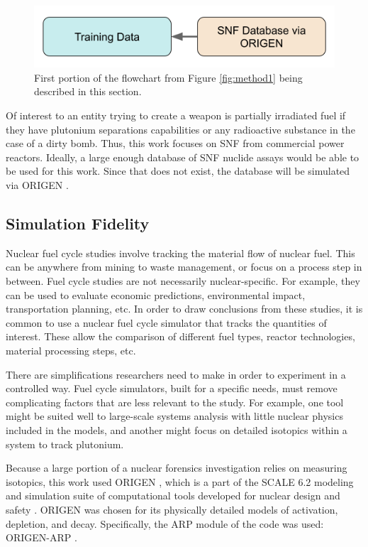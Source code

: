 \begin{figure}[H]
  \centering
  \includegraphics[width=0.7\linewidth]{./chapters/exp1/methodology1_1.png}
  \caption[First portion of the flowchart from Figure \ref{fig:method1}]
          {First portion of the flowchart from Figure \ref{fig:method1} being 
           described in this section.}
\end{figure}

Of interest to an entity trying to create a weapon is partially irradiated fuel
if they have plutonium separations capabilities or any radioactive substance in
the case of a dirty bomb. Thus, this work focuses on \gls{SNF} from commercial
power reactors. Ideally, a large enough database of \gls{SNF} nuclide assays
would be able to be used for this work. Since that does not exist, the 
database will be simulated via \gls{ORIGEN} \cite{origen, origenarp}.  

\subsection{Simulation Fidelity}
\label{sec:fidelity}

Nuclear fuel cycle studies involve tracking the material flow of nuclear fuel.
This can be anywhere from mining to waste management, or focus on a process
step in between. Fuel cycle studies are not necessarily nuclear-specific. For
example, they can be used to evaluate economic predictions, environmental
impact, transportation planning, etc.  In order to draw conclusions from these
studies, it is common to use a nuclear fuel cycle simulator that tracks the
quantities of interest. These allow the comparison of different fuel types,
reactor technologies, material processing steps, etc. 

There are simplifications researchers need to make in order to experiment in a
controlled way. Fuel cycle simulators, built for a specific needs, must remove
complicating factors that are less relevant to the study.  For example, one
tool might be suited well to large-scale systems analysis with little nuclear
physics included in the models, and another might focus on detailed isotopics
within a system to track plutonium.

Because a large portion of a nuclear forensics investigation relies on
measuring isotopics, this work used \gls{ORIGEN} \cite{origen}, which is a part
of the \gls{SCALE} 6.2 modeling and simulation suite of computational tools
developed for nuclear design and safety \cite{scale}. \gls{ORIGEN} was chosen
for its physically detailed models of activation, depletion, and decay.
Specifically, the ARP module of the code was used: \gls{ORIGEN-ARP}
\cite{origenarp}.

